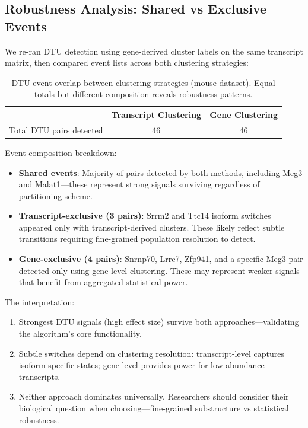 \subsection*{Robustness Analysis: Shared vs Exclusive Events}\label{sec:robustness}

We re-ran DTU detection using gene-derived cluster labels on the same transcript matrix, then compared event lists across both clustering strategies:

\begin{table}[htbp]
\centering
\begin{tabular}{lcc}
    \toprule
    & \textbf{Transcript Clustering} & \textbf{Gene Clustering} \\
    \midrule
    Total DTU pairs detected & 46 & 46 \\
    \bottomrule
\end{tabular}
\caption{DTU event overlap between clustering strategies (mouse dataset). Equal totals but different composition reveals robustness patterns.}
\label{tab:dtu-robustness}
\end{table}

Event composition breakdown:
\begin{itemize}
    \item \textbf{Shared events}: Majority of pairs detected by both methods, including Meg3 and Malat1---these represent strong signals surviving regardless of partitioning scheme.
    
    \item \textbf{Transcript-exclusive (3 pairs)}: Srrm2 and Ttc14 isoform switches appeared only with transcript-derived clusters. These likely reflect subtle transitions requiring fine-grained population resolution to detect.

    \item \textbf{Gene-exclusive (4 pairs)}: Snrnp70, Lrrc7, Zfp941, and a specific Meg3 pair detected only using gene-level clustering. These may represent weaker signals that benefit from aggregated statistical power.
\end{itemize}

The interpretation:
\begin{enumerate}
    \item Strongest DTU signals (high effect size) survive both approaches---validating the algorithm's core functionality.
    
    \item Subtle switches depend on clustering resolution: transcript-level captures isoform-specific states; gene-level provides power for low-abundance transcripts.
    
    \item Neither approach dominates universally. Researchers should consider their biological question when choosing---fine-grained substructure vs statistical robustness.
\end{enumerate}

